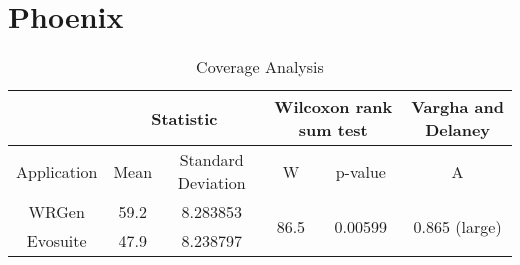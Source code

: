 \section{Phoenix}
\begin{table}[H]
	\centering
	\caption{Coverage Analysis}
	\begin{adjustbox}{max width=\textwidth}
		\begin{tabular}{|c|c|c|c|c|c|}
		\hline
			& \multicolumn{2}{c|}{Statistic} & \multicolumn{2}{c|}{Wilcoxon rank sum test} & Vargha and Delaney    \\
		\hline
			Application & Mean   & Standard Deviation   & W                               & p-value                             & A            			         \\
		\hline
			WRGen       & 59.2     & 8.283853             & \multirow{2}{*}{86.5}             & \multirow{2}{*}{0.00599}            & \multirow{2}{*}{0.865 (large)}  \\
		\cline{1-3}
			Evosuite    & 47.9   & 8.238797             &                                 &                                     &            			   		 \\
		\hline
		\end{tabular}
	\end{adjustbox}
\end{table}

